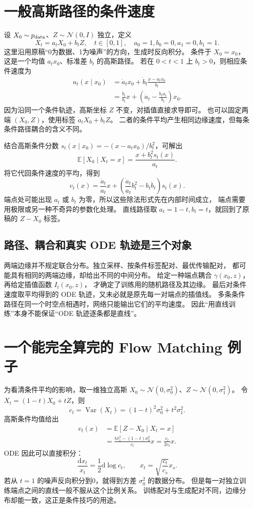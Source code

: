 \section{一般高斯路径的条件速度}
设 $X_0\sim p_{\rm data}$、$Z\sim\mathcal N(0,I)$ 独立，定义
\[
X_t=a_tX_0+b_tZ,\quad t\in[0,1],\quad
a_0=1,b_0=0,a_1=0,b_1=1.
\]
这里沿用原稿“0为数据、1为噪声”的方向，生成时反向积分。
条件于 $X_0=x_0$，这是一个均值 $a_tx_0$、标准差 $b_t$ 的高斯路径。
若在 $0<t<1$ 上 $b_t>0$，则相应条件速度为
\begin{align}
u_t(x\mid x_0)
 &=\dot a_tx_0+\dot b_t\frac{x-a_tx_0}{b_t}\\
 &=\frac{\dot b_t}{b_t}x+
 \left(\dot a_t-\frac{\dot b_ta_t}{b_t}\right)x_0.
\label{supp:affine-conditional}
\end{align}
因为沿同一个条件轨迹，高斯坐标 $Z$ 不变，对插值直接求导即可。
也可以固定两端 $(X_0,Z)$，使用标签 $\dot a_tX_0+\dot b_tZ$。
二者的条件平均产生相同边缘速度，但每条条件路径耦合的含义不同。

结合高斯条件分数
$s_t(x\mid x_0)=-(x-a_tx_0)/b_t^2$，可解出
\[
\mathbb E[X_0\mid X_t=x]
=\frac{x+b_t^2s_t(x)}{a_t}.
\]
将它代回条件速度的平均，得到
\[
v_t(x)=\frac{\dot a_t}{a_t}x+
 \left(\frac{\dot a_t}{a_t}b_t^2-b_t\dot b_t\right)s_t(x).
\label{supp:affine-marginal}
\]
端点处可能出现 $a_t$ 或 $b_t$ 为零，所以这些除法形式先在内部时间成立，
端点需要用极限或另一种不奇异的参数化处理。
直线路径取 $a_t=1-t,b_t=t$，就回到了原稿的 $Z-X_0$ 标签。

\subsection{路径、耦合和真实 ODE 轨迹是三个对象}
两端边缘并不规定联合分布。独立采样、按条件标签配对、最优传输配对，
都可能具有相同的两端边缘，却给出不同的中间分布。
给定一种端点耦合 $\gamma(x_0,z)$，再给定插值函数 $I_t(x_0,z)$，
才确定了训练用的随机路径及其边缘。
最后对条件速度取平均得到的 ODE 轨迹，又未必就是原先每一对端点的插值线。
多条条件路径在同一个时空点相遇时，网络只能输出它们的平均速度。
因此“用直线训练”本身不能保证“ODE 轨迹逐条都是直线”。

\section{一个能完全算完的 Flow Matching 例子}
为看清条件平均的影响，取一维独立高斯
$X_0\sim\mathcal N(0,\sigma_0^2)$、$Z\sim\mathcal N(0,\sigma_1^2)$。
令 $X_t=(1-t)X_0+tZ$，则
\[
c_t=\operatorname{Var}(X_t)=(1-t)^2\sigma_0^2+t^2\sigma_1^2.
\]
高斯条件均值给出
\begin{align}
v_t(x)&=\mathbb E[Z-X_0\mid X_t=x]\\
 &=\frac{t\sigma_1^2-(1-t)\sigma_0^2}{c_t}x
 =\frac{\dot c_t}{2c_t}x.
\end{align}
ODE 因此可以直接积分：
\[
\frac{\mathrm dx_t}{x_t}=\frac12\mathrm d\log c_t,
\qquad x_t=\sqrt{\frac{c_t}{c_s}}x_s.
\]
若从 $t=1$ 的噪声反向积分到0，就得到方差 $\sigma_0^2$ 的数据分布。
但是每一对独立训练端点之间的直线一般不服从这个比例关系。
训练配对与生成配对不同，边缘分布却能一致，这正是条件技巧的用途。

